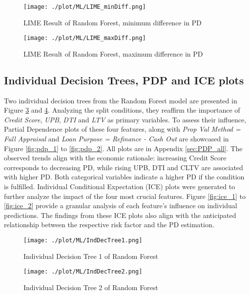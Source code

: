 \begin{figure}[H]
	\centering
	\texttt{[image: ./plot/ML/LIME\_minDiff.png]}
    \caption{LIME Result of Random Forest, minimum difference in PD}
    \label{fig:re_LIMEres_min}
\end{figure}

\begin{figure}[H]
	\centering
	\texttt{[image: ./plot/ML/LIME\_maxDiff.png]}
    \caption{LIME Result of Random Forest, maximum difference in PD}
    \label{fig:re_LIMEres_max}
\end{figure}

\subsection{Individual Decision Trees, PDP and ICE plots}
Two individual decision trees from the Random Forest model are presented in Figure \ref{fig:re_indtree1} and \ref{fig:re_indtree2}. Analyzing the split conditions, they reaffirm the importance of \emph{Credit Score}, \emph{UPB}, \emph{DTI} and \emph{LTV} as primary variables. To assess their influence, Partial Dependence plots of these four features, along with \emph{Prop Val Method = Full Appraisal} and \emph{Loan Purpose = Refinance - Cash Out} are showcased in Figure \ref{fig:pdp_1} to \ref{fig:pdp_2}. All plots are in Appendix \ref{sec:PDP_all}. The observed trends align with the economic rationale: increasing Credit Score corresponds to decreasing PD, while rising UPB, DTI and CLTV are associated with higher PD. Both categorical variables indicate a higher PD if the condition is fulfilled. Individual Conditional Expectation (ICE) plots were generated to further analyze the impact of the four most crucial features. Figure \ref{fig:ice_1} to \ref{fig:ice_2} provide a granular analysis of each feature's influence on individual predictions. The findings from these ICE plots also align with the anticipated relationship between the respective risk factor and the PD estimation.

\begin{figure}[H]
	\centering
	\texttt{[image: ./plot/ML/IndDecTree1.png]}
    \caption{Individual Decision Tree 1 of Random Forest}
    \label{fig:re_indtree1}
\end{figure}

\begin{figure}[H]
	\centering
	\texttt{[image: ./plot/ML/IndDecTree2.png]}
    \caption{Individual Decision Tree 2 of Random Forest}
    \label{fig:re_indtree2}
\end{figure}

